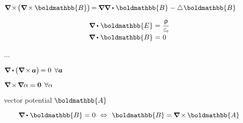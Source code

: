${\boldnabla \hspace{-0.2ex} \times \hspace{-0.3ex} \bigl( \boldnabla \hspace{-0.15ex} \times \hspace{-0.1ex} \boldmathbb{B} \bigr) \hspace{-0.25ex} = \hspace{-0.1ex} \boldnabla \boldnabla \dotp \hspace{.12ex} \boldmathbb{B} \hspace{.1ex} - \Laplacian \hspace{.05ex} \boldmathbb{B}}$

\nopagebreak\begin{equation*}
\begin{array}{r@{\hspace{.3em}}c@{\hspace{.3em}}l}
\boldnabla \dotp \hspace{.12ex} \boldmathbb{E} & = & \displaystyle \frac{\uprho}{\raisemath{.16em}{\vacuumpermittivity}}
\\[.5em]
\boldnabla \dotp \hspace{.12ex} \boldmathbb{B} & = & \hspace{.1ex} 0
\end{array}
\end{equation*}


...

${\boldnabla \dotp \hspace{-0.1ex} \bigl( \boldnabla \hspace{-0.2ex} \times \hspace{-0.16ex} \bm{a} \bigr) \hspace{-0.24ex} = 0 \:\:\forall \bm{a}}$

${\boldnabla \hspace{-0.15ex} \times \hspace{-0.25ex} \boldnabla \alpha = \bm{0} \:\:\forall \alpha}$

vector potential $\boldmathbb{A}$

\nopagebreak\[
\boldnabla \dotp \hspace{.12ex} \boldmathbb{B} = \hspace{.1ex} 0
\hspace{.4em} \Leftrightarrow \hspace{.4em}
\boldmathbb{B} =  \hspace{-0.1ex} \boldnabla \hspace{-0.15ex} \times \hspace{-0.12ex} \boldmathbb{A}
\]

